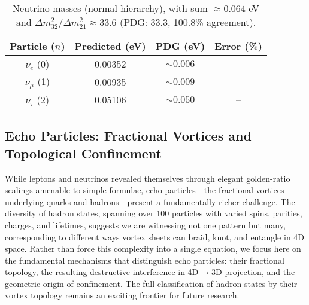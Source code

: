 \begin{table}[h!]
\centering
\begin{tabular}{|c|c|c|c|}
\hline
Particle ($n$) & Predicted (eV) & PDG (eV) & Error (\%) \\
\hline
$\nu_e$ (0) & 0.00352 & $\sim 0.006$ & -- \\
$\nu_\mu$ (1) & 0.00935 & $\sim 0.009$ & -- \\
$\nu_\tau$ (2) & 0.05106 & $\sim 0.050$ & -- \\
\hline
\end{tabular}
\caption{Neutrino masses (normal hierarchy), with sum $\approx 0.064$ eV and $\Delta m^2_{32}/\Delta m^2_{21} \approx 33.6$ (PDG: 33.3, 100.8\% agreement).}
\label{tab:neutrinos}
\end{table}


\subsection{Echo Particles: Fractional Vortices and Topological Confinement}

While leptons and neutrinos revealed themselves through elegant golden-ratio scalings amenable to simple formulae, echo particles---the fractional vortices underlying quarks and hadrons---present a fundamentally richer challenge. The diversity of hadron states, spanning over 100 particles with varied spins, parities, charges, and lifetimes, suggests we are witnessing not one pattern but many, corresponding to different ways vortex sheets can braid, knot, and entangle in 4D space. Rather than force this complexity into a single equation, we focus here on the fundamental mechanisms that distinguish echo particles: their fractional topology, the resulting destructive interference in 4D$\to$3D projection, and the geometric origin of confinement. The full classification of hadron states by their vortex topology remains an exciting frontier for future research.

